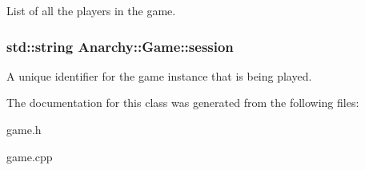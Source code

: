 List of all the players in the game. 

\hypertarget{classAnarchy_1_1Game_a575c3471b0f8813e00559d0f85d37cf1}{
\subsubsection[{session}]{\setlength{\rightskip}{0pt plus 5cm}std\-::string Anarchy\-::\-Game\-::session}}\label{classAnarchy_1_1Game_a575c3471b0f8813e00559d0f85d37cf1}


A unique identifier for the game instance that is being played. 



The documentation for this class was generated from the following files\-:\begin{DoxyCompactItemize}
\item 
game.\-h\item 
game.\-cpp\end{DoxyCompactItemize}
